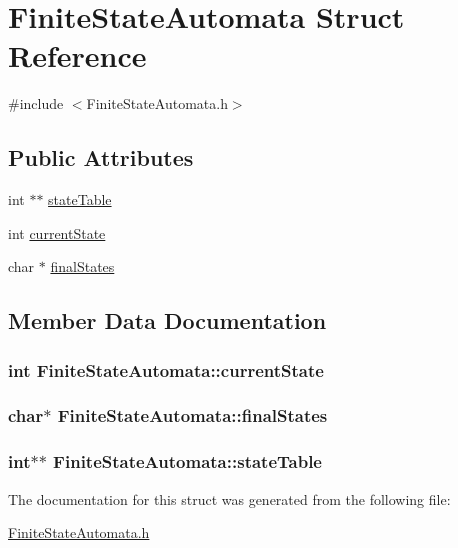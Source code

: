 \hypertarget{structFiniteStateAutomata}{\section{Finite\+State\+Automata Struct Reference}
\label{structFiniteStateAutomata}
}


{\ttfamily \#include $<$Finite\+State\+Automata.\+h$>$}

\subsection*{Public Attributes}
\begin{DoxyCompactItemize}
\item 
int $\ast$$\ast$ \hyperlink{structFiniteStateAutomata_af5edbdbd274139ce1561e686fe8b29bc}{state\+Table}
\item 
int \hyperlink{structFiniteStateAutomata_a0eb0a8d72bfeb8c8af8d61c5bfdd2f7a}{current\+State}
\item 
char $\ast$ \hyperlink{structFiniteStateAutomata_ace77610ca33f40b4cd7bddba2bdb7925}{final\+States}
\end{DoxyCompactItemize}


\subsection{Member Data Documentation}
\hypertarget{structFiniteStateAutomata_a0eb0a8d72bfeb8c8af8d61c5bfdd2f7a}{
\subsubsection[{current\+State}]{\setlength{\rightskip}{0pt plus 5cm}int Finite\+State\+Automata\+::current\+State}}\label{structFiniteStateAutomata_a0eb0a8d72bfeb8c8af8d61c5bfdd2f7a}
\hypertarget{structFiniteStateAutomata_ace77610ca33f40b4cd7bddba2bdb7925}{
\subsubsection[{final\+States}]{\setlength{\rightskip}{0pt plus 5cm}char$\ast$ Finite\+State\+Automata\+::final\+States}}\label{structFiniteStateAutomata_ace77610ca33f40b4cd7bddba2bdb7925}
\hypertarget{structFiniteStateAutomata_af5edbdbd274139ce1561e686fe8b29bc}{
\subsubsection[{state\+Table}]{\setlength{\rightskip}{0pt plus 5cm}int$\ast$$\ast$ Finite\+State\+Automata\+::state\+Table}}\label{structFiniteStateAutomata_af5edbdbd274139ce1561e686fe8b29bc}


The documentation for this struct was generated from the following file\+:\begin{DoxyCompactItemize}
\item 
\hyperlink{FiniteStateAutomata_8h}{Finite\+State\+Automata.\+h}\end{DoxyCompactItemize}
